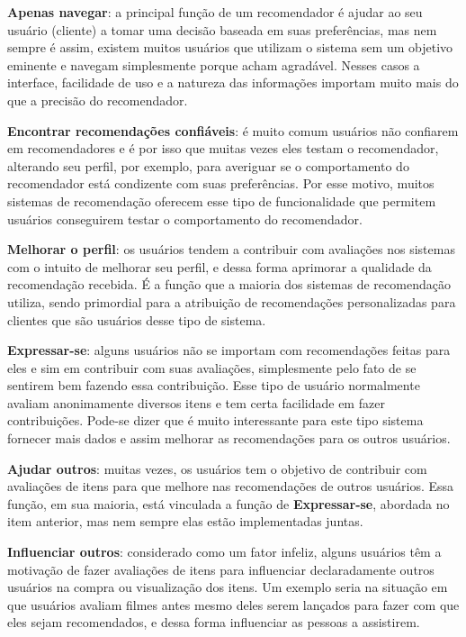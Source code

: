 \textbf{Apenas navegar}: a principal função de um recomendador é ajudar ao seu usuário (cliente) a tomar uma decisão baseada em suas preferências, mas nem sempre é assim, existem muitos usuários que utilizam o sistema sem um objetivo eminente e navegam simplesmente porque acham agradável. Nesses casos a interface, facilidade de uso e a natureza das informações importam muito mais do que a precisão do recomendador.

\textbf{Encontrar recomendações confiáveis}: é muito comum usuários não confiarem em recomendadores e é por isso que muitas vezes eles testam o recomendador, alterando seu perfil, por exemplo, para averiguar se o comportamento do recomendador está condizente com suas preferências. Por esse motivo, muitos sistemas de recomendação oferecem esse tipo de funcionalidade que permitem usuários conseguirem testar o comportamento do recomendador.

\textbf{Melhorar o perfil}: os usuários tendem a contribuir com avaliações nos sistemas com o intuito de melhorar seu perfil, e dessa forma aprimorar a qualidade da recomendação recebida. É a função que a maioria dos sistemas de recomendação utiliza, sendo primordial para a atribuição de recomendações personalizadas para clientes que são usuários desse tipo de sistema.

\textbf{Expressar-se}: alguns usuários não se importam com recomendações feitas para eles e sim em contribuir com suas avaliações, simplesmente pelo fato de se sentirem bem fazendo essa contribuição. Esse tipo de usuário normalmente avaliam anonimamente diversos itens e tem certa facilidade em fazer contribuições. Pode-se dizer que é muito interessante para este tipo sistema fornecer mais dados e assim melhorar as recomendações para os outros usuários.

\textbf{Ajudar outros}: muitas vezes, os usuários tem o objetivo de contribuir com avaliações de itens para que melhore nas recomendações de outros usuários. Essa função, em sua maioria, está vinculada a função de \textbf{Expressar-se}, abordada no item anterior, mas nem sempre elas estão implementadas juntas.

\textbf{Influenciar outros}: considerado como um fator infeliz, alguns usuários têm a motivação de fazer avaliações de itens para influenciar declaradamente outros usuários na compra ou visualização dos itens. Um exemplo seria na situação em que usuários avaliam filmes antes mesmo deles serem lançados para fazer com que eles sejam recomendados,  e dessa forma influenciar as pessoas a assistirem.


